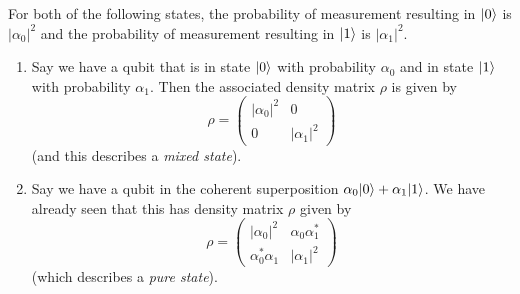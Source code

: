 \documentclass[10pt]{article}
\DeclarePairedDelimiter\ket{\lvert}{\rangle}
\begin{document}
\begin{itemize}
                    For both of the following states, the probability of measurement resulting in $\ket{0}$ is $|\alpha_0|^2$ and the probability of measurement resulting in $\ket{1}$ is $|\alpha_1|^2$.
                    \begin{enumerate}
                        \item Say we have a qubit that is in state $\ket{0}$ with probability $\alpha_0$ and in state $\ket{1}$ with probability $\alpha_1$.
                            Then the associated density matrix $\rho$ is given by
                            \begin{equation*}
                                \rho = \left(
                                \begin{array}{cc}
                                    |\alpha_0|^2 & 0\\
                                    0 & |\alpha_1|^2
                                \end{array}
                                \right)
                            \end{equation*}
                            (and this describes a \emph{mixed state}).
                        \item Say we have a qubit in the coherent superposition $\alpha_0\ket{0}+\alpha_1\ket{1}$.
                            We have already seen that this has density matrix $\rho$ given by
                            \begin{equation*}
                                \rho = \left(
                                \begin{array}{cc}
                                    |\alpha_0|^2 & \alpha_0\alpha_1^*\\
                                    \alpha_0^*\alpha_1 & |\alpha_1|^2
                                \end{array}
                                \right)
                            \end{equation*}
                            (which describes a \emph{pure state}).
                    \end{enumerate}


\end{itemize}
\end{document}
